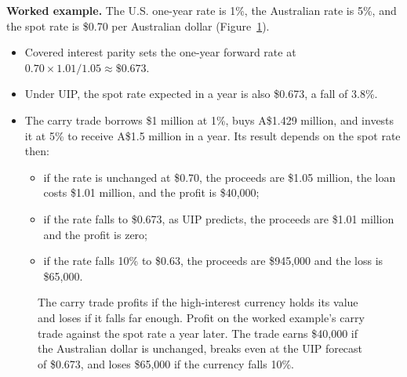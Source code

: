 \textbf{Worked example.} The U.S. one-year rate is 1\%, the Australian rate is 5\%, and the spot rate is \$0.70 per Australian dollar (Figure~\ref{fig:06-carry}).

\begin{itemize}
  \item Covered interest parity sets the one-year forward rate at $0.70 \times 1.01/1.05 \approx \$0.673$.
  \item Under UIP, the spot rate expected in a year is also \$0.673, a fall of 3.8\%.
  \item The carry trade borrows \$1 million at 1\%, buys A\$1.429 million, and invests it at 5\% to receive A\$1.5 million in a year. Its result depends on the spot rate then:
  \begin{itemize}
    \item if the rate is unchanged at \$0.70, the proceeds are \$1.05 million, the loan costs \$1.01 million, and the profit is \$40,000;
    \item if the rate falls to \$0.673, as UIP predicts, the proceeds are \$1.01 million and the profit is zero;
    \item if the rate falls 10\% to \$0.63, the proceeds are \$945,000 and the loss is \$65,000.
  \end{itemize}
\end{itemize}


\begin{figure}[htbp]
\centering
{}
\caption{The carry trade profits if the high-interest currency holds its value and loses if it falls far enough. Profit on the worked example's carry trade against the spot rate a year later. The trade earns \$40,000 if the Australian dollar is unchanged, breaks even at the UIP forecast of \$0.673, and loses \$65,000 if the currency falls 10\%.}
\label{fig:06-carry}
\end{figure}

